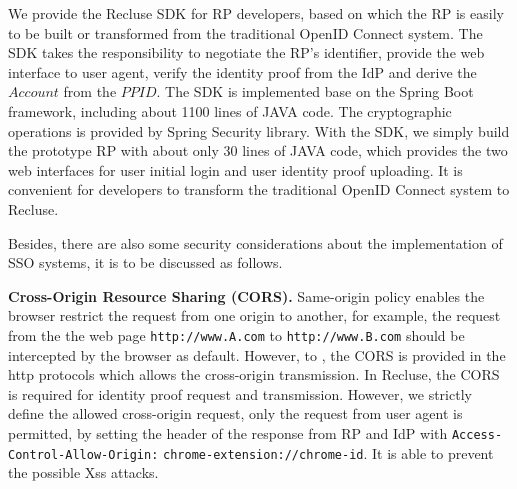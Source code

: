 We provide the Recluse SDK for RP developers, based on which the RP is easily to be built or transformed from the traditional OpenID Connect system. The SDK takes the responsibility to negotiate the RP's identifier, provide the web interface to user agent, verify the identity proof from the IdP and derive the $Account$ from the $PPID$. The SDK is implemented base on the Spring Boot framework, including about 1100 lines of JAVA code. The cryptographic operations is provided by Spring Security library. With the SDK, we simply build the prototype RP with about only 30 lines of JAVA code, which provides the two web interfaces for user initial login and user identity  proof uploading. It is convenient for developers to transform the traditional OpenID Connect system to Recluse.

Besides, there are also some security considerations about the implementation of SSO systems, it is to be discussed as follows.

\noindent\textbf{Cross-Origin Resource Sharing (CORS).} Same-origin policy enables the browser restrict the request from one origin to another, for example, the request from the the web page \verb+http://www.A.com+ to \verb+http://www.B.com+ should be intercepted by the browser as default. However, to , the CORS is provided in the http protocols which allows the cross-origin transmission. In Recluse, the CORS is required for identity proof request and transmission. However, we strictly define the allowed cross-origin request, only the request from user agent is permitted, by setting the header of the response from RP and IdP with \verb+Access-Control-Allow-Origin:+ \verb+chrome-extension://chrome-id+. It is able to prevent the possible Xss attacks.


